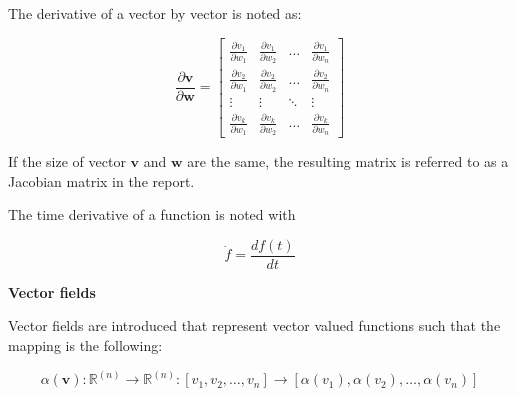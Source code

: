The derivative of a vector by vector is noted as:

\begin{equation}
\frac{\partial{\bm{v}}}{\partial{\bm{w}}} =
\begin{bmatrix}
    \frac{\partial v_{1}}{\partial w_1} & \frac{\partial v_{1}}{\partial w_2} &  \dots  & \frac{\partial v_{1}}{\partial w_n} \\
    \frac{\partial v_{2}}{\partial w_1} & \frac{\partial v_{2}}{\partial w_2} &  \dots  & \frac{\partial v_{2}}{\partial w_n} \\
    \vdots & \vdots &  \ddots & \vdots \\
    \frac{\partial v_{k}}{\partial w_1} & \frac{\partial v_{k}}{\partial w_2} &  \dots  & \frac{\partial v_{k}}{\partial w_n}
\end{bmatrix}
\end{equation}

If the size of vector $\bm{v}$ and $\bm{w}$ are the same, the resulting matrix is referred to as a Jacobian matrix in the report.

The time derivative of a function is noted with

\begin{equation}
\dot{f} = \frac{d f(t)}{dt}
\end{equation}

\textbf{Vector fields}

Vector fields are introduced that represent vector valued functions such that the mapping is the following:

\begin{equation}
\alpha(\bm{v}) : \pmb{{\mathbb{R}}}^{(n)} \rightarrow \pmb{{\mathbb{R}}}^{(n)} : [v_1, v_2, \hdots, v_n] \rightarrow [\alpha(v_1), \alpha(v_2),\hdots,\alpha(v_n)]
\end{equation}



